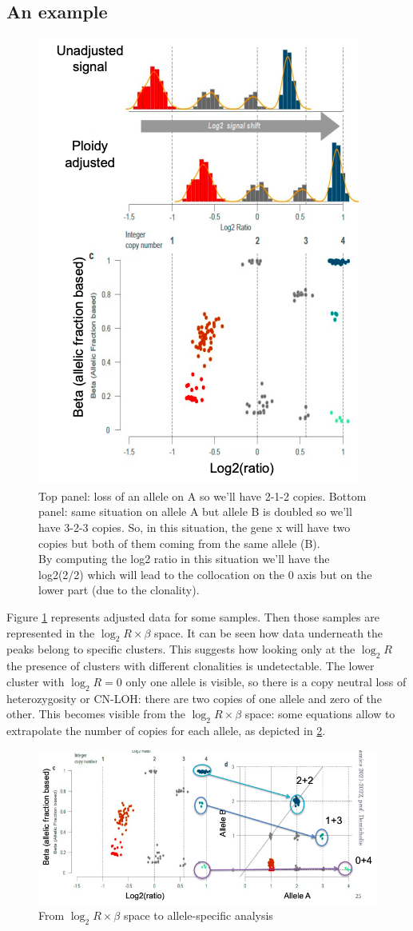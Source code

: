   \subsection{An example}
  \begin{figure}[H]
    \centering
    \includegraphics[width=0.5\linewidth]{image11.png}
    \caption{Top panel: loss of an allele on A so we'll have 2-1-2 copies. Bottom panel: same situation on allele A but allele B is doubled so we'll have 3-2-3 copies. So, in this situation, the gene x will have two copies but both of them coming from the same allele (B).\\
      By computing the log2 ratio in this situation we'll have the log2(2/2) which will lead to the collocation on the 0 axis but on the lower part (due to the clonality).}
    \label{fig:img11}
  \end{figure}

  Figure \ref{fig:img11} represents adjusted data for some samples.
  Then those samples are represented in the $\log_2 R\times\beta$ space.
  It can be seen how data underneath the peaks belong to specific clusters.
  This suggests how looking only at the $\log_2 R$ the presence of clusters with different clonalities is undetectable.
  The lower cluster with $\log_2 R = 0$ only one allele is visible, so there is a copy neutral loss of heterozygosity or CN-LOH: there are two copies of one allele and zero of the other.
  This becomes visible from the $\log_2 R\times \beta$ space: some equations allow to extrapolate the number of copies for each allele, as depicted in \ref{fig:img12}.

  \begin{figure}[H]
    \centering
    \includegraphics[width=0.5\linewidth]{image12.png}
    \caption{From $\log_2 R\times \beta$ space to allele-specific analysis}
    \label{fig:img12}
  \end{figure}

